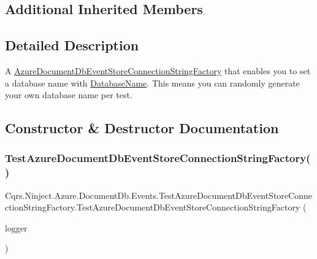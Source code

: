 \subsection*{Additional Inherited Members}


\subsection{Detailed Description}
A \hyperlink{classCqrs_1_1Azure_1_1DocumentDb_1_1Events_1_1AzureDocumentDbEventStoreConnectionStringFactory_a7503e00bedc6af5686ded0b6b7719a30_a7503e00bedc6af5686ded0b6b7719a30}{Azure\+Document\+Db\+Event\+Store\+Connection\+String\+Factory} that enables you to set a database name with \hyperlink{classCqrs_1_1Ninject_1_1Azure_1_1DocumentDb_1_1Events_1_1TestAzureDocumentDbEventStoreConnectionStringFactory_ad82e2485313ff7802ad125958173f3bf_ad82e2485313ff7802ad125958173f3bf}{Database\+Name}. This means you can randomly generate your own database name per test. 



\subsection{Constructor \& Destructor Documentation}
\mbox{\label{classCqrs_1_1Ninject_1_1Azure_1_1DocumentDb_1_1Events_1_1TestAzureDocumentDbEventStoreConnectionStringFactory_ab9c02577f0f7b3b43d5d4d53a9755894_ab9c02577f0f7b3b43d5d4d53a9755894}} 
\subsubsection{\texorpdfstring{Test\+Azure\+Document\+Db\+Event\+Store\+Connection\+String\+Factory()}{TestAzureDocumentDbEventStoreConnectionStringFactory()}}
{\footnotesize\ttfamily Cqrs.\+Ninject.\+Azure.\+Document\+Db.\+Events.\+Test\+Azure\+Document\+Db\+Event\+Store\+Connection\+String\+Factory.\+Test\+Azure\+Document\+Db\+Event\+Store\+Connection\+String\+Factory (\begin{DoxyParamCaption}\item[{I\+Logger}]{logger }\end{DoxyParamCaption})}




